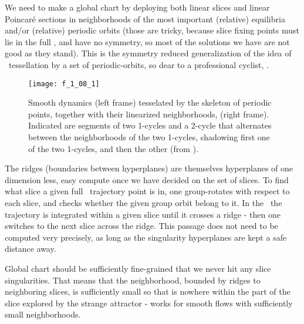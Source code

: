 We need to make a global chart by deploying both linear slices and linear
Poincar\'e sections in neighborhoods of the most important (relative)
equilibria and/or (relative) periodic orbits (those are tricky, because
slice fixing points must lie in the full \statesp, and have no symmetry,
so most of the solutions we have are not good as they stand). This is the
symmetry reduced generalization of the idea of
{\statesp\ tessellation} by a set of periodic-orbits,
so dear to a professional cyclist, .

 \begin{figure}
 \begin{center}
\texttt{[image: f\_1\_08\_1]}
 \end{center}
 \caption{\label{fig:Tesselate}
Smooth dynamics  (left frame) tesselated by the skeleton of
periodic points, together with their linearized neighborhoods,
(right frame).
Indicated are segments of two 1-cycles and a 2-cycle that
alternates between the neighborhoods of the two 1-cycles,
shadowing first one of the two 1-cycles, and then the other
(from \wwwcb{}).
  }\end{figure}
%


The ridges (boundaries
between hyperplanes) are themselves hyperplanes of one dimension less,
easy compute once we have decided on the set of slices. To find
what slice a given full \statesp\ trajectory point is in, one group-rotates
with respect to each slice, and checks whether the given group orbit
belong to it. In the \reducedsp\ the trajectory is integrated within a
given slice until it crosses a ridge - then one switches to
the next slice across the ridge. This passage does not need to
be computed very precisely, as long as the singularity
hyperplanes are kept a safe distance away. 

Global chart should be sufficiently fine-grained that we never hit any slice singularities. That means that the neighborhood, bounded by ridges to neighboring slices, is sufficiently small so that {\sset} is nowhere within the part of the slice explored by the strange attractor - works for smooth flows with sufficiently small neighborhoods.

